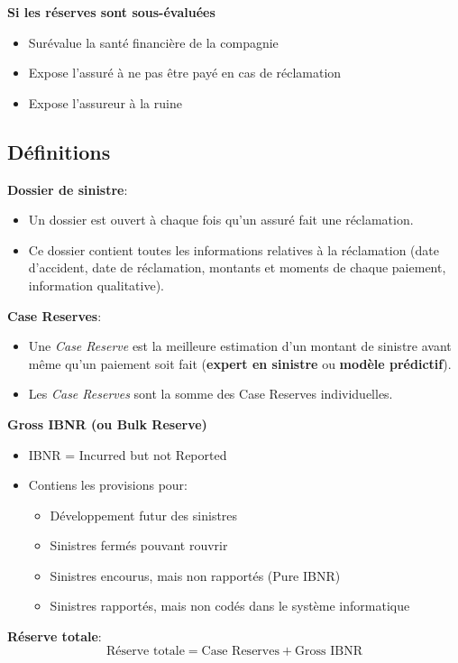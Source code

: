 \documentclass[11pt,french]{report}
\begin{document}
\textbf{Si les réserves sont sous-évaluées}
\begin{itemize}
  \item Surévalue la santé financière de la compagnie
  \item Expose l'assuré à ne pas être payé en cas de réclamation
  \item Expose l'assureur à la ruine
\end{itemize}


\subsection*{Définitions}

\textbf{Dossier de sinistre}:
\begin{itemize}
  \item Un dossier est ouvert à chaque fois qu'un assuré fait une réclamation.
  \item Ce dossier contient toutes les informations relatives à la réclamation (date d'accident, date de réclamation, montants et moments de chaque paiement, information qualitative).
\end{itemize}

\textbf{Case Reserves}:
\begin{itemize}
  \item Une \textit{Case Reserve} est la meilleure estimation d'un montant de sinistre avant même qu'un paiement soit fait (\textbf{expert en sinistre} ou \textbf{modèle prédictif}).
  \item Les \textit{Case Reserves} sont la somme des Case Reserves individuelles.
\end{itemize}

\textbf{Gross IBNR (ou Bulk Reserve)}
\begin{itemize}
  \item IBNR = Incurred but not Reported
  \item Contiens les provisions pour:
  \begin{itemize}
    \item Développement futur des sinistres
    \item Sinistres fermés pouvant rouvrir
    \item Sinistres encourus, mais non rapportés (Pure IBNR)
    \item Sinistres rapportés, mais non codés dans le système informatique
  \end{itemize}
\end{itemize}
 
\textbf{Réserve totale}:
$$\text{Réserve totale} = \text{Case Reserves} + \text{Gross IBNR}$$
\end{document}
